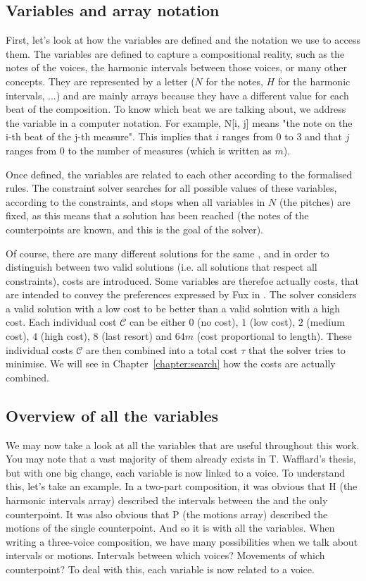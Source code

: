 \subsection{Variables and array notation} \label{Wafflard-variables}
First, let's look at how the variables are defined and the notation we use to access them. The variables are defined to capture a compositional reality, such as the notes of the voices, the harmonic intervals between those voices, or many other concepts. They are represented by a letter ($N$ for the notes, $H$ for the harmonic intervals, ...) and are mainly arrays because they have a different value for each beat of the composition. To know which beat we are talking about, we address the variable in a computer notation. For example, N[i, j] means "the note on the i-th beat of the j-th measure". This implies that $i$ ranges from $0$ to $3$ and that $j$ ranges from $0$ to the number of measures (which is written as $m$).

Once defined, the variables are related to each other according to the formalised rules. The constraint solver searches for all possible values of these variables, according to the constraints, and stops when all variables in $N$ (the pitches) are fixed, as this means that a solution has been reached (the notes of the counterpoints are known, and this is the goal of the solver).

Of course, there are many different solutions for the same \cf, and in order to distinguish between two valid solutions (i.e. all solutions that respect all constraints), costs are introduced. Some variables are therefoe actually costs, that are intended to convey the preferences expressed by Fux in \gap. The solver considers a valid solution with a low cost to be better than a valid solution with a high cost. Each individual cost $\mathcal{C}$ can be either $0$ (no cost), $1$ (low cost), $2$ (medium cost), $4$ (high cost), $8$ (last resort) and $64m$ (cost proportional to length). These individual costs $\mathcal{C}$  are then combined into a total cost $\tau$  that the solver tries to minimise. We will see in Chapter~\ref{chapter:search} how the costs are actually combined.


\subsection{Overview of all the variables}
We may now take a look at all the variables that are useful throughout this work. You may note that a vast majority of them already exists in T. Wafflard's thesis, but with one big change, each variable is now linked to a voice. To understand this, let's take an example. In a two-part composition, it was obvious that H (the harmonic intervals array) described the intervals between the \cfs and the only counterpoint. It was also obvious that P (the motions array) described the motions of the single counterpoint. And so it is with all the variables. When writing a three-voice composition, we have many possibilities when we talk about intervals or motions. Intervals between which voices? Movements of which counterpoint? To deal with this, each variable is now related to a voice.

